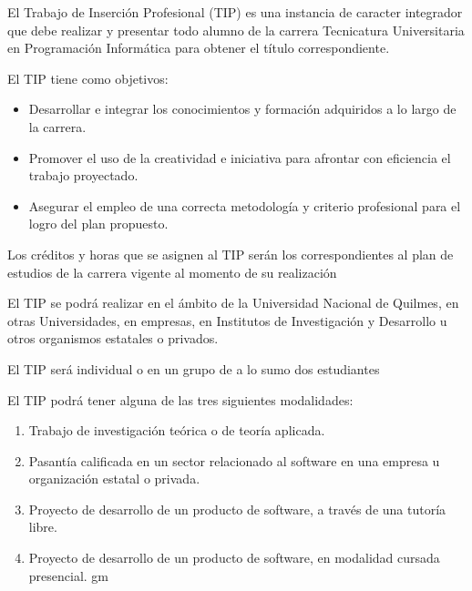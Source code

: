 


\articulo El Trabajo de Inserción Profesional (TIP) es una instancia de
caracter integrador que debe realizar y presentar todo alumno de la carrera
Tecnicatura Universitaria en Programación Informática para obtener el título
correspondiente.

 El TIP tiene como objetivos:
\begin{itemize}
 \item Desarrollar e integrar los conocimientos y formación adquiridos a lo
 largo de la carrera.
 \item Promover el uso de la creatividad e iniciativa para afrontar con
 eficiencia el trabajo proyectado.
 \item Asegurar el empleo de una correcta metodología y criterio
 profesional para el logro del plan propuesto.
\end{itemize}

\articulo Los créditos y horas que se asignen al TIP serán los
correspondientes al plan de estudios de la carrera vigente al momento de su
realización


\articulo El TIP se podrá realizar en el ámbito de la Universidad Nacional de
Quilmes, en otras Universidades, en empresas, en Institutos de Investigación y
Desarrollo u otros organismos estatales o privados. 

\articulo El TIP será individual o en un grupo de a lo sumo dos estudiantes

\articulo El TIP podrá tener alguna de las tres siguientes modalidades:
\begin{enumerate}
\item Trabajo de investigación teórica o de teoría aplicada.
\item Pasantía calificada en un sector relacionado al software en una
empresa u organización estatal o privada.
\item Proyecto de desarrollo de un producto de software, a través de una tutoría libre.
\item Proyecto de desarrollo de un producto de software, en modalidad cursada presencial.
gm\end{enumerate}

